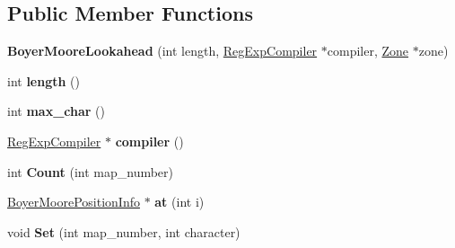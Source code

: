 \subsection*{Public Member Functions}
\begin{DoxyCompactItemize}
\item 
\hypertarget{classv8_1_1internal_1_1_boyer_moore_lookahead_ab6a48b1e2e6882f08b2b6675ff8df09c}{}{\bfseries Boyer\+Moore\+Lookahead} (int length, \hyperlink{classv8_1_1internal_1_1_reg_exp_compiler}{Reg\+Exp\+Compiler} $\ast$compiler, \hyperlink{classv8_1_1internal_1_1_zone}{Zone} $\ast$zone)\label{classv8_1_1internal_1_1_boyer_moore_lookahead_ab6a48b1e2e6882f08b2b6675ff8df09c}

\item 
\hypertarget{classv8_1_1internal_1_1_boyer_moore_lookahead_adf8931d50830d985a1423b6b1b8612db}{}int {\bfseries length} ()\label{classv8_1_1internal_1_1_boyer_moore_lookahead_adf8931d50830d985a1423b6b1b8612db}

\item 
\hypertarget{classv8_1_1internal_1_1_boyer_moore_lookahead_aa29b6ac73eb53c5bfce5be63b0a7ebd5}{}int {\bfseries max\+\_\+char} ()\label{classv8_1_1internal_1_1_boyer_moore_lookahead_aa29b6ac73eb53c5bfce5be63b0a7ebd5}

\item 
\hypertarget{classv8_1_1internal_1_1_boyer_moore_lookahead_aa9e74726e490b7e55d846bfbf9117b74}{}\hyperlink{classv8_1_1internal_1_1_reg_exp_compiler}{Reg\+Exp\+Compiler} $\ast$ {\bfseries compiler} ()\label{classv8_1_1internal_1_1_boyer_moore_lookahead_aa9e74726e490b7e55d846bfbf9117b74}

\item 
\hypertarget{classv8_1_1internal_1_1_boyer_moore_lookahead_a59acc100fba6e91982d56037e23430a2}{}int {\bfseries Count} (int map\+\_\+number)\label{classv8_1_1internal_1_1_boyer_moore_lookahead_a59acc100fba6e91982d56037e23430a2}

\item 
\hypertarget{classv8_1_1internal_1_1_boyer_moore_lookahead_a966ed7328590844feb533c01078ad12f}{}\hyperlink{classv8_1_1internal_1_1_boyer_moore_position_info}{Boyer\+Moore\+Position\+Info} $\ast$ {\bfseries at} (int i)\label{classv8_1_1internal_1_1_boyer_moore_lookahead_a966ed7328590844feb533c01078ad12f}

\item 
\hypertarget{classv8_1_1internal_1_1_boyer_moore_lookahead_af4c7e21eb752bb01e83017365c1f9df0}{}void {\bfseries Set} (int map\+\_\+number, int character)\label{classv8_1_1internal_1_1_boyer_moore_lookahead_af4c7e21eb752bb01e83017365c1f9df0}


\end{DoxyCompactItemize}
